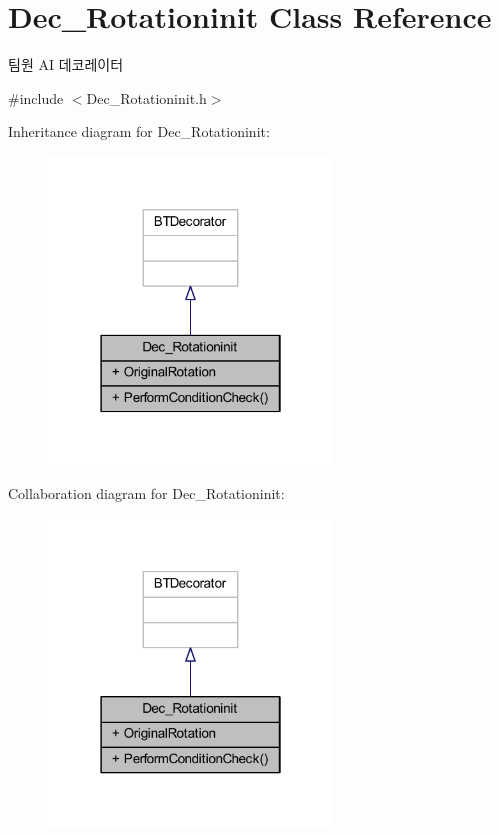 \hypertarget{class_dec___rotationinit}{}\section{Dec\+\_\+\+Rotationinit Class Reference}
\label{class_dec___rotationinit}


팀원 AI 데코레이터  




{\ttfamily \#include $<$Dec\+\_\+\+Rotationinit.\+h$>$}



Inheritance diagram for Dec\+\_\+\+Rotationinit\+:
\nopagebreak
\begin{figure}[H]
\begin{center}
\leavevmode
\includegraphics[width=214pt]{class_dec___rotationinit__inherit__graph}
\end{center}
\end{figure}


Collaboration diagram for Dec\+\_\+\+Rotationinit\+:
\nopagebreak
\begin{figure}[H]
\begin{center}
\leavevmode
\includegraphics[width=214pt]{class_dec___rotationinit__coll__graph}
\end{center}
\end{figure}

